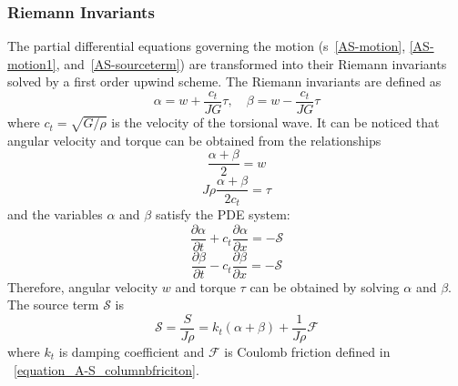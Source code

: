 \subsubsection{Riemann Invariants}
The partial differential equations governing the motion (\equationname{}s~\ref{AS-motion}, \ref{AS-motion1}, and~\ref{AS-sourceterm}) are transformed into their Riemann invariants solved by a first order upwind scheme. The Riemann invariants are defined as
\begin{equation}\label{AS-Riemann}
  \alpha = w + \frac{c_t}{JG}\tau, \quad \beta=w-\frac{c_t}{JG}\tau
\end{equation}
where $c_t = \sqrt{G/\rho}$ is the velocity of the torsional wave. It can be noticed that angular velocity and torque can be obtained from the relationships
\begin{equation}\label{equation_Riemann_relation1}
  \frac{\alpha + \beta}{2} = w
\end{equation}
\begin{equation}\label{equation_Riemann_relation2}
  J \rho \frac{\alpha + \beta}{2c_t} = \tau
\end{equation}
and the variables $\alpha$ and $\beta$ satisfy the PDE system:
\begin{equation}\label{AS-Riemann_alpha}
  \frac{\partial \alpha}{\partial t} + c_t\frac{\partial \alpha}{\partial x} = -\mathcal{S}
\end{equation}
\begin{equation}\label{AS-Riemann_beta}
  \frac{\partial \beta}{\partial t} - c_t\frac{\partial \beta}{\partial x} = -\mathcal{S}
\end{equation}
Therefore, angular velocity $w$ and torque $\tau$ can be obtained by solving $\alpha$ and $\beta$.
The source term $\mathcal{S}$ is
\begin{equation}\label{AS-source}
  \mathcal{S} = \frac{S}{J \rho} = k_t(\alpha + \beta) + \frac{1}{J \rho} \mathcal{F}
\end{equation} 
where $k_t$ is damping coefficient and $\mathcal{F}$ is Coulomb friction defined in \equationname~\ref{equation_A-S_columnbfriciton}.
